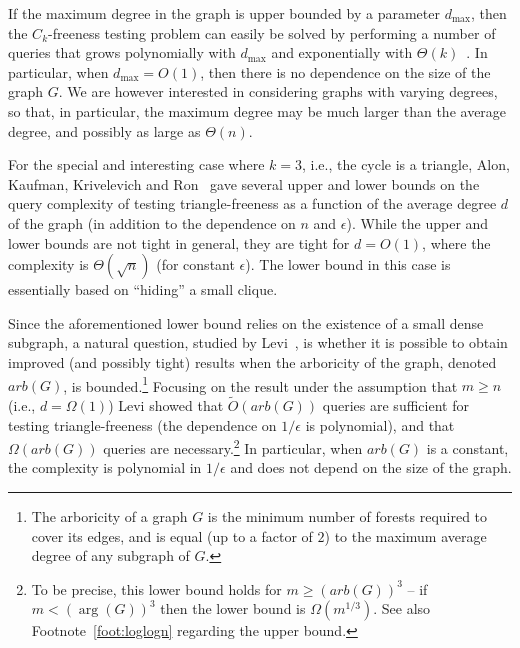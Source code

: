 \documentclass{article}
\newcommand{\eps}{\epsilon}
\newcommand{\commentt}[1]{ {}}
\newcommand{\SodaReb}[1]{{ #1}}
\begin{document}
If the maximum degree in the graph is upper bounded by a parameter $d_{\max}$, then the $C_k$-freeness testing problem can easily be solved by performing a number of queries that grows polynomially with $d_{\max}$ and exponentially with $\Theta(k)$~\cite{GR-bound}. \commentt{Explain that this holds in general model or no need?}
In particular, when $d_{\max} = O(1)$, then there is no dependence on the size of the graph $G$. 
We are however interested in considering graphs with varying degrees, so that, in particular, the maximum degree may be   much larger than the average degree, and possibly as large as $\Theta(n)$.


For the special and interesting case where $k=3$, i.e., the cycle is a triangle,  Alon, Kaufman, Krivelevich and Ron~\cite{AKKR08} gave several upper and lower bounds on the query complexity of testing triangle-freeness as a function of the average degree $d$ of the graph (in addition to the dependence on $n$ and $\eps$).
While the upper and lower bounds are not tight  in general, they are tight for $d=O(1)$, where the complexity is $\Theta(\sqrt{n})$ (for constant $\epsilon$). 
The lower bound in this case is essentially based on ``hiding'' a small clique. 


Since the aforementioned lower bound relies on the existence of a small dense subgraph, a natural question, studied by Levi~\cite{Reut}, is whether it is possible to obtain improved (and possibly tight) results when the arboricity of the graph, denoted $arb(G)$, is bounded.\footnote{The arboricity of a graph $G$ is the minimum number of forests required to cover its edges, and is equal (up to a factor of $2$) to the maximum average degree of any subgraph of $G$.} Focusing on the result under the assumption that $m\geq n$ (i.e., $d= \Omega(1)$) Levi showed that  
$\widetilde{O}(arb(G))$  queries are sufficient for testing triangle-freeness (the dependence on $1/\epsilon$ is polynomial), and that $\Omega(arb(G))$ queries are necessary.\footnote{To be precise, this lower bound holds for $m\geq (arb(G))^3$ -- if $m< (\arg(G))^3$ then the lower bound is $\Omega(m^{1/3})$. \SodaReb{See also Footnote~\ref{foot:loglogn} regarding the upper bound.}}
In particular, when $arb(G)$ is a constant, the complexity is polynomial in $1/\eps$ and does not depend on the size of the graph.
\end{document}
